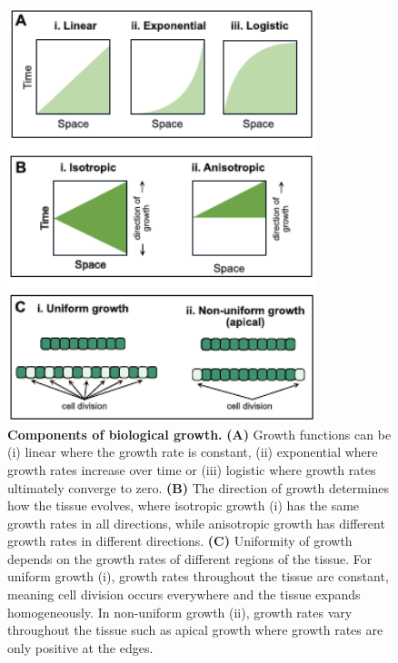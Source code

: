 


\begin{figure}[h!]
    \centering
    \includegraphics[width=0.8\textwidth]{chapters/Introduction/growth}
    \caption{\textbf{Components of biological growth.} \textbf{(A)} Growth functions can be (i) linear where the growth rate is constant, (ii) exponential where growth rates increase over time or (iii) logistic where growth rates ultimately converge to zero. \textbf{(B)} The direction of growth determines how the tissue evolves, where isotropic growth (i) has the same growth rates in all directions, while anisotropic growth has different growth rates in different directions. \textbf{(C)} Uniformity of growth depends on the growth rates of different regions of the tissue. For uniform growth (i), growth rates throughout the tissue are constant, meaning cell division occurs everywhere and the tissue expands homogeneously. In non-uniform growth (ii), growth rates vary throughout the tissue such as apical growth where growth rates are only positive at the edges.}
    \label{fig:growth}
\end{figure}


